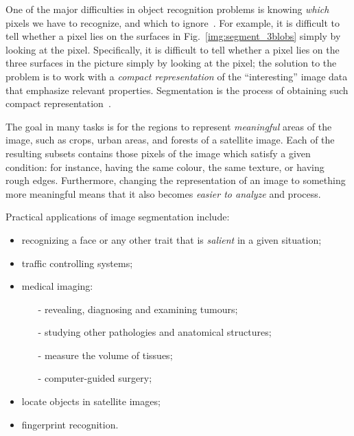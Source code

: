 One of the major difficulties in object recognition problems is knowing \emph{which} pixels we have to recognize, and which to ignore~\cite{forsyth}. For example, it is difficult to tell whether a pixel lies on the surfaces in Fig.~\ref{img:segment_3blobs} simply by looking at the pixel. Specifically, it is difficult to tell whether a pixel lies on the three surfaces in the picture simply by looking at the pixel; the solution to the problem is to work with a \emph{compact representation} of the ``interesting'' image data that emphasize relevant properties. Segmentation is the process of obtaining such compact representation~\cite{shapiro_stockman}.

The goal in many tasks is for the regions to represent \emph{meaningful} areas of the image, such as crops, urban areas, and forests of a satellite image. Each of the resulting subsets contains those pixels of the image which satisfy a given condition: for instance, having the same colour, the same texture, or having rough edges. Furthermore, changing the representation of an image to something more meaningful means that it also becomes \emph{easier to analyze} and process.

Practical applications of image segmentation include:
\begin{itemize}
\item recognizing a face or any other trait that is \emph{salient} in a given situation;

\item traffic controlling systems;

\item medical imaging:
	\begin{itemize}
	\item[-] revealing, diagnosing and examining tumours;
	
	\item[-] studying other pathologies and anatomical structures;
		
	\item[-] measure the volume of tissues;
	
	\item[-] computer-guided surgery;
	\end{itemize}

\item locate objects in satellite images;

\item fingerprint recognition.
\end{itemize}

